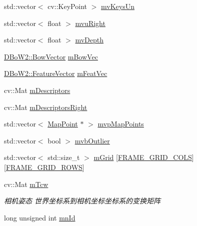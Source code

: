 \begin{DoxyCompactItemize}
\item 
std\+::vector$<$ cv\+::\+Key\+Point $>$ \mbox{\hyperlink{class_o_r_b___s_l_a_m2_1_1_frame_a13737fa65f0ce693275f1919240bac35}{mv\+Keys\+Un}}
\item 
std\+::vector$<$ float $>$ \mbox{\hyperlink{class_o_r_b___s_l_a_m2_1_1_frame_a09a1957b966542e640ecabc41ec76c16}{mvu\+Right}}
\item 
std\+::vector$<$ float $>$ \mbox{\hyperlink{class_o_r_b___s_l_a_m2_1_1_frame_a4232b92ebf890728291ef2a66e7d39bb}{mv\+Depth}}
\item 
\mbox{\hyperlink{class_d_bo_w2_1_1_bow_vector}{D\+Bo\+W2\+::\+Bow\+Vector}} \mbox{\hyperlink{class_o_r_b___s_l_a_m2_1_1_frame_a68bbc187861a8e5c0ed9d92b5308c2cb}{m\+Bow\+Vec}}
\item 
\mbox{\hyperlink{class_d_bo_w2_1_1_feature_vector}{D\+Bo\+W2\+::\+Feature\+Vector}} \mbox{\hyperlink{class_o_r_b___s_l_a_m2_1_1_frame_a8153622c07ed98421bd7c7b2b7451b03}{m\+Feat\+Vec}}
\item 
cv\+::\+Mat \mbox{\hyperlink{class_o_r_b___s_l_a_m2_1_1_frame_a0dfc1a363215ad0a09303e612a1ffbe7}{m\+Descriptors}}
\item 
cv\+::\+Mat \mbox{\hyperlink{class_o_r_b___s_l_a_m2_1_1_frame_afe3cee153dda7e06d5004fd959fcd88e}{m\+Descriptors\+Right}}
\item 
std\+::vector$<$ \mbox{\hyperlink{class_o_r_b___s_l_a_m2_1_1_map_point}{Map\+Point}} $\ast$ $>$ \mbox{\hyperlink{class_o_r_b___s_l_a_m2_1_1_frame_a48e791ae28b483211dad6b3474027935}{mvp\+Map\+Points}}
\item 
std\+::vector$<$ bool $>$ \mbox{\hyperlink{class_o_r_b___s_l_a_m2_1_1_frame_aa05cc57f36b5b04a2e1690e576c93fc8}{mvb\+Outlier}}
\item 
std\+::vector$<$ std\+::size\+\_\+t $>$ \mbox{\hyperlink{class_o_r_b___s_l_a_m2_1_1_frame_a194dca06186458639d46234d828afeed}{m\+Grid}} \mbox{[}\mbox{\hyperlink{_frame_8h_a3ef79fa8924a9c5df3cddac58a52ab0c}{F\+R\+A\+M\+E\+\_\+\+G\+R\+I\+D\+\_\+\+C\+O\+LS}}\mbox{]}\mbox{[}\mbox{\hyperlink{_frame_8h_a9550f0488f3dac9a5c56f0d3c07c01c1}{F\+R\+A\+M\+E\+\_\+\+G\+R\+I\+D\+\_\+\+R\+O\+WS}}\mbox{]}
\item 
cv\+::\+Mat \mbox{\hyperlink{class_o_r_b___s_l_a_m2_1_1_frame_a3be6708cfd359fae30307f9408abd6f9}{m\+Tcw}}
\begin{DoxyCompactList}\small\item\em 相机姿态 世界坐标系到相机坐标坐标系的变换矩阵 \end{DoxyCompactList}\item 
long unsigned int \mbox{\hyperlink{class_o_r_b___s_l_a_m2_1_1_frame_acd59686475a89bfdfcae316dfa6b6069}{mn\+Id}}

\end{DoxyCompactItemize}
